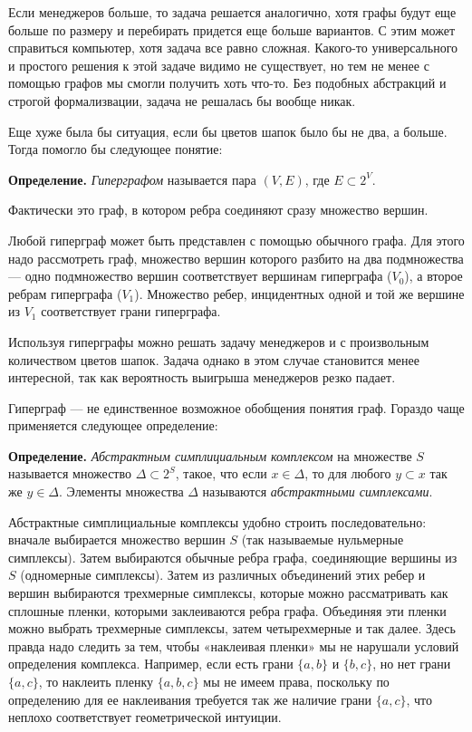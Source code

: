 Если менеджеров больше, то задача решается аналогично, хотя графы будут еще больше по размеру и перебирать придется еще больше вариантов. С этим может справиться компьютер, хотя задача все равно сложная. Какого-то универсального и простого решения к этой задаче видимо не существует, но тем не менее с помощью графов мы смогли получить хоть что-то. Без подобных абстракций и строгой формализвации, задача не решалась бы вообще никак.

Еще хуже была бы ситуация, если бы цветов шапок было бы не два, а больше. Тогда помогло бы следующее понятие:

{\bfseries Определение.} {\slshape Гиперграфом} называется пара $(V, E)$, где $E\subset 2^V$.

Фактически это граф, в котором ребра соединяют сразу множество вершин.

Любой гиперграф может быть представлен с помощью обычного графа. Для этого надо рассмотреть граф, множество вершин которого разбито на два подмножества — одно подмножество вершин соответствует вершинам гиперграфа ($V_0$), а второе ребрам гиперграфа ($V_1$). Множество ребер, инцидентных одной и той же вершине из $V_1$ соответствует грани гиперграфа.

Используя гиперграфы можно решать задачу менеджеров и с произвольным количеством цветов шапок. Задача однако в этом случае становится менее интересной, так как вероятность выигрыша менеджеров резко падает.

Гиперграф — не единственное возможное обобщения понятия граф. Гораздо чаще применяется следующее определение:

{\bfseries Определение.} {\slshape Абстрактным симплициальным комплексом} на множестве $S$ называется множество $\Delta\subset 2^S$, такое, что если $x\in \Delta$, то для любого $y\subset x$ так же $y\in\Delta$. Элементы множества $\Delta$ называются {\slshape абстрактными симплексами}.

Абстрактные симплициальные комплексы удобно строить последовательно: вначале выбирается множество вершин $S$ (так называемые нульмерные симплексы). Затем выбираются обычные ребра графа, соединяющие вершины из $S$ (одномерные симплексы). Затем из различных объединений этих ребер и вершин выбираются трехмерные симплексы, которые можно рассматривать как сплошные пленки, которыми заклеиваются ребра графа. Объединяя эти пленки можно выбрать трехмерные симплексы, затем четырехмерные и так далее. Здесь правда надо следить за тем, чтобы «наклеивая пленки» мы не нарушали условий определения комплекса. Например, если есть грани $\{a, b\}$ и $\{b, c\}$, но нет грани $\{a, c\}$, то наклеить пленку $\{a, b, c\}$ мы не имеем права, поскольку по определению для ее наклеивания требуется так же наличие грани $\{a, c\}$, что неплохо соответствует геометрической интуиции.

